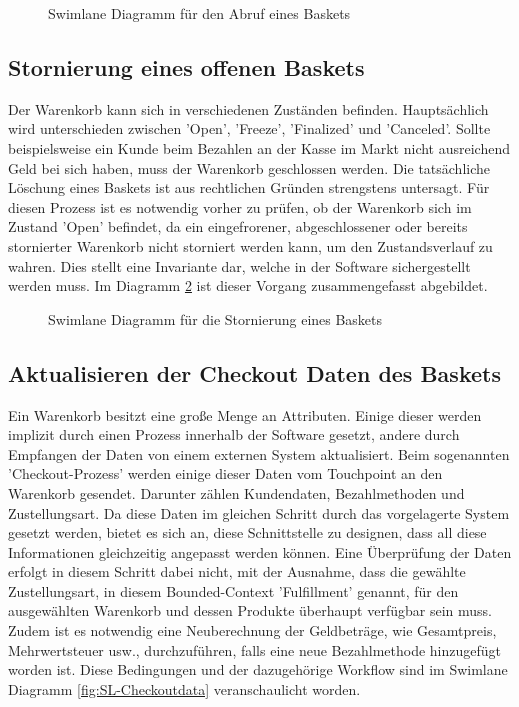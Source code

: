 \begin{figure}[htbp]
	\centering
	
	\caption{Swimlane Diagramm für den Abruf eines Baskets}
	\label{fig:SL-Basketabruf}
\end{figure}

\subsection{Stornierung eines offenen Baskets}

Der Warenkorb kann sich in verschiedenen Zuständen befinden. Hauptsächlich wird unterschieden zwischen 'Open', 'Freeze', 'Finalized' und 'Canceled'. Sollte beispielsweise ein Kunde beim Bezahlen an der Kasse im Markt nicht ausreichend Geld bei sich haben, muss der Warenkorb geschlossen werden. Die tatsächliche Löschung eines Baskets ist aus rechtlichen Gründen strengstens untersagt. Für diesen Prozess ist es notwendig vorher zu prüfen, ob der Warenkorb sich im Zustand 'Open' befindet, da ein eingefrorener, abgeschlossener oder bereits stornierter Warenkorb nicht storniert werden kann, um den Zustandsverlauf zu wahren. Dies stellt eine Invariante dar, welche in der Software sichergestellt werden muss. Im Diagramm \ref{fig:SL-Basketstornierung} ist dieser Vorgang zusammengefasst abgebildet.

\begin{figure}[htbp]
	\centering
	
	\caption{Swimlane Diagramm für die Stornierung eines Baskets}
	\label{fig:SL-Basketstornierung}
\end{figure}

\subsection{Aktualisieren der Checkout Daten des Baskets}

Ein Warenkorb besitzt eine große Menge an Attributen. Einige dieser werden implizit durch einen Prozess innerhalb der Software gesetzt, andere durch Empfangen der Daten von einem externen System aktualisiert. Beim sogenannten 'Checkout-Prozess' werden einige dieser Daten vom Touchpoint an den Warenkorb gesendet. Darunter zählen Kundendaten, Bezahlmethoden und Zustellungsart. Da diese Daten im gleichen Schritt durch das vorgelagerte System gesetzt werden, bietet es sich an, diese Schnittstelle zu designen, dass all diese Informationen gleichzeitig angepasst werden können. Eine Überprüfung der Daten erfolgt in diesem Schritt dabei nicht, mit der Ausnahme, dass die gewählte Zustellungsart, in diesem Bounded-Context 'Fulfillment' genannt, für den ausgewählten Warenkorb und dessen Produkte überhaupt verfügbar sein muss. Zudem ist es notwendig eine Neuberechnung der Geldbeträge, wie Gesamtpreis, Mehrwertsteuer usw., durchzuführen, falls eine neue Bezahlmethode hinzugefügt worden ist. Diese Bedingungen und der dazugehörige Workflow sind im Swimlane Diagramm \ref{fig:SL-Checkoutdata} veranschaulicht worden.


